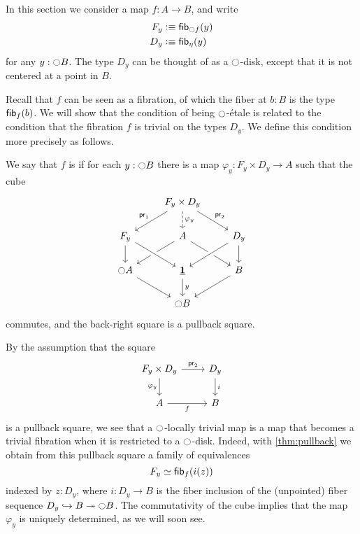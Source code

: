 \documentclass[9pt,twosided]{amsart}
\begin{document}
  In this section we consider a map $f:A\to B$, and write
  \begin{align*}
    F_y & \defeq \fib{\modal f}{y} \\
    D_y & \defeq \fib{\eta}{y}
  \end{align*}
  for any $y:{\ocircle} B$. The type $D_y$ can be thought of as a ${\ocircle}$-disk, except that it is not centered at a point in $B$.

  Recall that $f$ can be seen as a fibration, of which the fiber at $b:B$ is the type $\fib{f}{b}$. We will show that the condition of being ${\ocircle}$-\'etale is related to the condition that the fibration $f$ is trivial on the types $D_y$. We define this condition more precisely as follows.
  
\begin{defn}
 We say that $f$ is  if for each $y:{\ocircle} B$ there is a map $\varphi_y:F_y\times D_y \to A$ such that the cube
  \begin{equation*}
    \begin{tikzcd}
      & F_y\times D_y \arrow[dl,swap,"\proj 1"] \arrow[d,dashed,"\varphi_y"] \arrow[dr,"\proj 2"] \\
      F_y \arrow[d] & A \arrow[dl] \arrow[dr] & D_y \arrow[d] \arrow[dl,crossing over] \\
      \modal A \arrow[dr] & \unit \arrow[from=ul,crossing over] \arrow[d,"y"] & B \arrow[dl] \\
      & \modal B
    \end{tikzcd}
  \end{equation*}
  commutes, and the back-right square is a pullback square.
\end{defn}

By the assumption that the square
\begin{equation*}
  \begin{tikzcd}
    F_y\times D_y \arrow[r,"\proj 2"] \arrow[d,swap,"\varphi_y"] & D_y \arrow[d,"i"] \\
    A \arrow[r,swap,"f"] & B
  \end{tikzcd}
\end{equation*}
is a pullback square, we see that a ${\ocircle}$-locally trivial map is a map that becomes a trivial fibration when it is restricted to a ${\ocircle}$-disk. Indeed, with \cref{thm:pullback} we obtain from this pullback square a family of equivalences
\begin{equation*}
  F_y \simeq \fib{f}{i(z)}
\end{equation*}
indexed by $z:D_y$, where $i:D_y\to B$ is the fiber inclusion of the (unpointed) fiber sequence $D_y\hookrightarrow B\twoheadrightarrow{\ensuremath{\ocircle}} B$. The commutativity of the cube implies that the map $\varphi_y$ is uniquely determined, as we will soon see.
\end{document}
